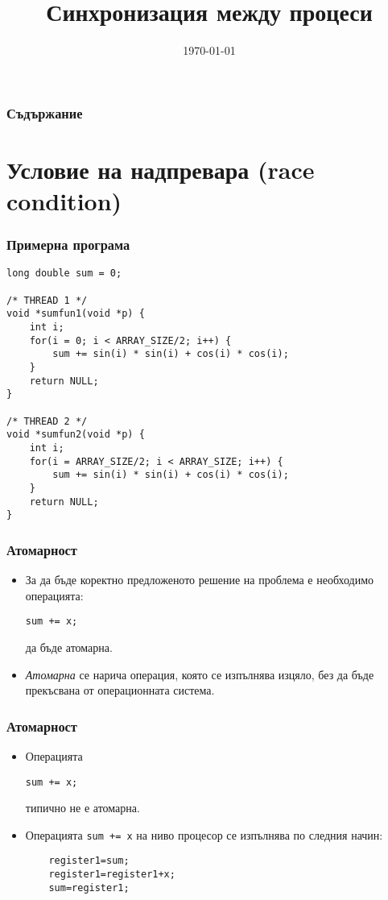 \documentclass[ignorenonframetext, hyperref=unicode]{beamer}
\title[Синхронизация {(\em\rcsInfoRevision)}]{Синхронизация между процеси}
\date{\today}
\begin{document}
\frame{\maketitle}

\begin{frame}
\frametitle{Съдържание}
\tableofcontents %
\end{frame}

\section{Условие на надпревара (race condition)}

\begin{frame}[containsverbatim]
\frametitle{Примерна програма}
\begin{lstlisting}
long double sum = 0;

/* THREAD 1 */
void *sumfun1(void *p) {
	int i;
	for(i = 0; i < ARRAY_SIZE/2; i++) {
		sum += sin(i) * sin(i) + cos(i) * cos(i);
	}
	return NULL;
}

/* THREAD 2 */
void *sumfun2(void *p) {
	int i;
	for(i = ARRAY_SIZE/2; i < ARRAY_SIZE; i++) {
		sum += sin(i) * sin(i) + cos(i) * cos(i);
	}
	return NULL;
}

\end{lstlisting}
\end{frame}

\begin{frame}[containsverbatim]
\frametitle{Атомарност}
\begin{itemize}
  \item За да бъде коректно предложеното решение на проблема е необходимо операцията:
  \begin{lstlisting}[numbers=none]
	sum += x;
  \end{lstlisting}
  да бъде атомарна.
  \item {\em Атомарна} се нарича операция, която се изпълнява изцяло, без да бъде
  прекъсвана от операционната система.
\end{itemize}
\end{frame}

\begin{frame}[containsverbatim]
\frametitle{Атомарност}
\begin{itemize}
  \item Операцията
  \begin{lstlisting}[numbers=none]
	sum += x;
  \end{lstlisting}
  типично не е атомарна.
  \item Операцията \lstinline{sum += x} на ниво процесор се изпълнява
  по следния начин:
\begin{lstlisting}
	register1=sum;
	register1=register1+x;
	sum=register1;
\end{lstlisting}

\end{itemize}
\end{frame}
\end{document}
